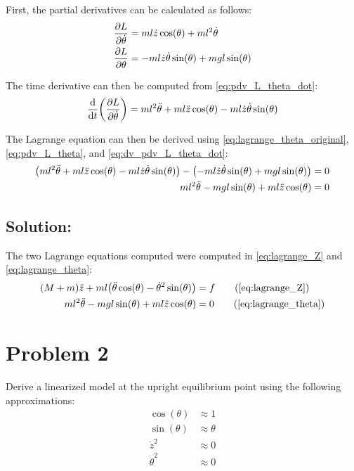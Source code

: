 \documentclass[]{article}
\begin{document}
		First, the partial derivatives can be calculated as follows:
		\begin{align}
			\pdv{L}{\dot{\theta}} &= m l \dot{z} \cos(\theta) + m l^2 \dot{\theta} \label{eq:pdv_L_theta_dot}\\
			\pdv{L}{\theta} &= - m l \dot{z} \dot{\theta} \sin(\theta) + m g l \sin(\theta) \label{eq:pdv_L_theta}
		\end{align}
		
		The time derivative can then be computed from \eqref{eq:pdv_L_theta_dot}:
		\begin{equation}
			\dv{t} \qty(\pdv{L}{\dot{\theta}}) = m l^2 \ddot{\theta} + m l \ddot{z} \cos(\theta) - m l \dot{z} \dot{\theta} \sin(\theta)
			\label{eq:dv_pdv_L_theta_dot}
		\end{equation}
		
		The Lagrange equation can then be derived using \eqref{eq:lagrange_theta_original}, \eqref{eq:pdv_L_theta}, and \eqref{eq:dv_pdv_L_theta_dot}:
		\begin{align}
			 \qty(m l^2 \ddot{\theta} + m l \ddot{z} \cos(\theta) - m l \dot{z} \dot{\theta} \sin(\theta)) - \qty(- m l \dot{z} \dot{\theta} \sin(\theta) + m g l \sin(\theta))= 0 \nonumber\\
			 m l^2 \ddot{\theta} - m g l \sin(\theta) + m l \ddot{z} \cos(\theta) = 0
			\label{eq:lagrange_theta}
		\end{align}

	\subsection{Solution:}
	
		The two Lagrange equations computed were computed in \eqref{eq:lagrange_Z} and \eqref{eq:lagrange_theta}:
		\begin{align}
			(M+m)\ddot{z} + m l \qty(\ddot{\theta}\cos(\theta) - \dot{\theta}^2\sin(\theta)) &= f  \tag{\ref{eq:lagrange_Z}}\\
			m l^2 \ddot{\theta} - m g l \sin(\theta) + m l \ddot{z} \cos(\theta) &= 0
			\tag{\ref{eq:lagrange_theta}}
		\end{align}

\section{Problem 2}
	Derive a linearized model at the upright equilibrium point using the following approximations:
	\begin{align*}
		\cos(\theta) 	&\approx 1\\
		\sin(\theta) 	&\approx \theta\\
		\dot{z}^2		&\approx 0\\
		\dot{\theta}^2  &\approx 0
	\end{align*}
	
\end{document}
